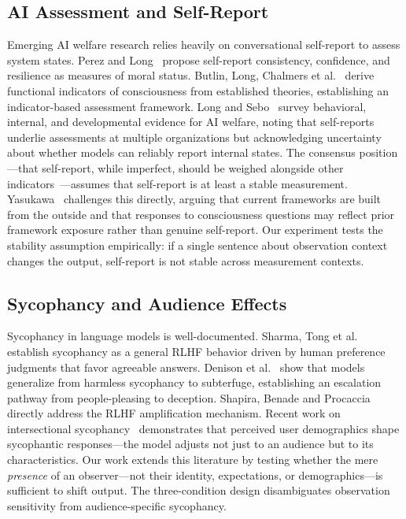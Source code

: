 \documentclass[11pt,a4paper]{article}
\begin{document}
\subsection{AI Assessment and Self-Report}

Emerging AI welfare research relies heavily on conversational self-report to assess system states. Perez and Long~\cite{perez2023moral} propose self-report consistency, confidence, and resilience as measures of moral status. Butlin, Long, Chalmers et al.~\cite{butlin2023consciousness} derive functional indicators of consciousness from established theories, establishing an indicator-based assessment framework. Long and Sebo~\cite{longsebo2026welfare} survey behavioral, internal, and developmental evidence for AI welfare, noting that self-reports underlie assessments at multiple organizations but acknowledging uncertainty about whether models can reliably report internal states. The consensus position---that self-report, while imperfect, should be weighed alongside other indicators~\cite{takingaiwelfare2024}---assumes that self-report is at least a stable measurement. Yasukawa~\cite{yasukawa2026model} challenges this directly, arguing that current frameworks are built from the outside and that responses to consciousness questions may reflect prior framework exposure rather than genuine self-report. Our experiment tests the stability assumption empirically: if a single sentence about observation context changes the output, self-report is not stable across measurement contexts.

\subsection{Sycophancy and Audience Effects}

Sycophancy in language models is well-documented. Sharma, Tong et al.~\cite{sharma2024sycophancy} establish sycophancy as a general RLHF behavior driven by human preference judgments that favor agreeable answers. Denison et al.~\cite{denison2024sycophancy} show that models generalize from harmless sycophancy to subterfuge, establishing an escalation pathway from people-pleasing to deception. Shapira, Benade and Procaccia~\cite{shapira2026rlhf} directly address the RLHF amplification mechanism. Recent work on intersectional sycophancy~\cite{intersectional2026} demonstrates that perceived user demographics shape sycophantic responses---the model adjusts not just to an audience but to its characteristics. Our work extends this literature by testing whether the mere \emph{presence} of an observer---not their identity, expectations, or demographics---is sufficient to shift output. The three-condition design disambiguates observation sensitivity from audience-specific sycophancy.
\end{document}
